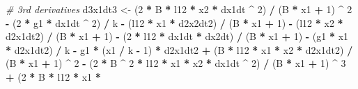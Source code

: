 \documentclass[12pt,twoside,openany]{reedthesis}
\newenvironment{Shaded}{\begin{snugshade}}{\end{snugshade}}
\newcommand{\DecValTok}[1]{\textcolor[rgb]{0.00,0.00,0.81}{#1}}
\newcommand{\StringTok}[1]{\textcolor[rgb]{0.31,0.60,0.02}{#1}}
\newcommand{\CommentTok}[1]{\textcolor[rgb]{0.56,0.35,0.01}{\textit{#1}}}
\newcommand{\OperatorTok}[1]{\textcolor[rgb]{0.81,0.36,0.00}{\textbf{#1}}}
\newcommand{\NormalTok}[1]{#1}
\begin{document}
\begin{Shaded}
\begin{Highlighting}[]
  \CommentTok{# 3rd derivatives}
\NormalTok{  d3x1dt3 <-}
\StringTok{  }\NormalTok{(}\DecValTok{2} \OperatorTok{*}\StringTok{ }\NormalTok{B }\OperatorTok{*}\StringTok{ }\NormalTok{l12 }\OperatorTok{*}\StringTok{ }\NormalTok{x2 }\OperatorTok{*}\StringTok{ }\NormalTok{dx1dt }\OperatorTok{^}\StringTok{ }\DecValTok{2}\NormalTok{) }\OperatorTok{/}\StringTok{ }\NormalTok{(B }\OperatorTok{*}\StringTok{ }\NormalTok{x1 }\OperatorTok{+}\StringTok{ }\DecValTok{1}\NormalTok{) }\OperatorTok{^}\StringTok{ }\DecValTok{2} \OperatorTok{-}\StringTok{ }\NormalTok{(}\DecValTok{2} \OperatorTok{*}\StringTok{ }\NormalTok{g1 }\OperatorTok{*}\StringTok{ }\NormalTok{dx1dt }\OperatorTok{^}\StringTok{ }\DecValTok{2}\NormalTok{) }\OperatorTok{/}
\StringTok{  }\NormalTok{k }\OperatorTok{-}\StringTok{ }\NormalTok{(l12 }\OperatorTok{*}\StringTok{ }\NormalTok{x1 }\OperatorTok{*}\StringTok{ }\NormalTok{d2x2dt2) }\OperatorTok{/}\StringTok{ }\NormalTok{(B }\OperatorTok{*}\StringTok{ }\NormalTok{x1 }\OperatorTok{+}\StringTok{ }\DecValTok{1}\NormalTok{) }\OperatorTok{-}\StringTok{ }\NormalTok{(l12 }\OperatorTok{*}\StringTok{ }\NormalTok{x2 }\OperatorTok{*}\StringTok{ }\NormalTok{d2x1dt2) }\OperatorTok{/}\StringTok{ }\NormalTok{(B }\OperatorTok{*}\StringTok{ }\NormalTok{x1 }\OperatorTok{+}\StringTok{ }\DecValTok{1}\NormalTok{) }\OperatorTok{-}\StringTok{ }\NormalTok{(}\DecValTok{2} \OperatorTok{*}
\StringTok{  }\NormalTok{l12 }\OperatorTok{*}\StringTok{ }\NormalTok{dx1dt }\OperatorTok{*}\StringTok{ }\NormalTok{dx2dt) }\OperatorTok{/}\StringTok{ }\NormalTok{(B }\OperatorTok{*}\StringTok{ }\NormalTok{x1 }\OperatorTok{+}\StringTok{ }\DecValTok{1}\NormalTok{) }\OperatorTok{-}\StringTok{ }\NormalTok{(g1 }\OperatorTok{*}\StringTok{ }\NormalTok{x1 }\OperatorTok{*}\StringTok{ }\NormalTok{d2x1dt2) }\OperatorTok{/}\StringTok{ }\NormalTok{k }\OperatorTok{-}\StringTok{ }\NormalTok{g1 }\OperatorTok{*}\StringTok{ }\NormalTok{(x1 }\OperatorTok{/}
\StringTok{  }\NormalTok{k }\OperatorTok{-}\StringTok{ }\DecValTok{1}\NormalTok{) }\OperatorTok{*}\StringTok{ }\NormalTok{d2x1dt2 }\OperatorTok{+}\StringTok{ }\NormalTok{(B }\OperatorTok{*}\StringTok{ }\NormalTok{l12 }\OperatorTok{*}\StringTok{ }\NormalTok{x1 }\OperatorTok{*}\StringTok{ }\NormalTok{x2 }\OperatorTok{*}\StringTok{ }\NormalTok{d2x1dt2) }\OperatorTok{/}\StringTok{ }\NormalTok{(B }\OperatorTok{*}\StringTok{ }\NormalTok{x1 }\OperatorTok{+}\StringTok{ }\DecValTok{1}\NormalTok{) }\OperatorTok{^}\StringTok{ }\DecValTok{2} \OperatorTok{-}\StringTok{ }\NormalTok{(}\DecValTok{2} \OperatorTok{*}
\StringTok{  }\NormalTok{B }\OperatorTok{^}\StringTok{ }\DecValTok{2} \OperatorTok{*}\StringTok{ }\NormalTok{l12 }\OperatorTok{*}\StringTok{ }\NormalTok{x1 }\OperatorTok{*}\StringTok{ }\NormalTok{x2 }\OperatorTok{*}\StringTok{ }\NormalTok{dx1dt }\OperatorTok{^}\StringTok{ }\DecValTok{2}\NormalTok{) }\OperatorTok{/}\StringTok{ }\NormalTok{(B }\OperatorTok{*}\StringTok{ }\NormalTok{x1 }\OperatorTok{+}\StringTok{ }\DecValTok{1}\NormalTok{) }\OperatorTok{^}\StringTok{ }\DecValTok{3} \OperatorTok{+}\StringTok{ }\NormalTok{(}\DecValTok{2} \OperatorTok{*}\StringTok{ }\NormalTok{B }\OperatorTok{*}\StringTok{ }\NormalTok{l12 }\OperatorTok{*}\StringTok{ }\NormalTok{x1 }\OperatorTok{*}

\end{Highlighting}
\end{Shaded}
\end{document}
